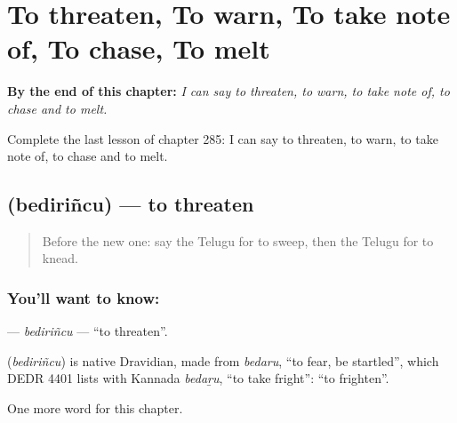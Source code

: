 
\chapter{To threaten, To warn, To take note of, To chase, To melt}
\label{ch:te-to-threaten-to-warn-to-take-note-of-to-chase-to-melt}

\begin{chapteropening}
\textbf{By the end of this chapter:} \emph{I can say to threaten, to warn, to take note of, to chase and to melt.}

Complete the last lesson of chapter 285: I can say to threaten, to warn, to take note of, to chase and to melt.
\end{chapteropening}

\section[\texorpdfstring{\te{బెదిరించు} (bediriñcu)}{బెదిరించు (bediriñcu)}]{ (bediriñcu) — to threaten}

\label{lesson:TE-C285-bedirincu}



\begin{quote}
Before the new one: say the Telugu for to sweep, then the Telugu for to knead.
\end{quote}

\subsection*{You'll want to know: }
\textbf{} — \emph{bediriñcu} — \textquotedblleft{}to threaten\textquotedblright{}.

\begin{cousinweb}
\textbf{} (\emph{bediriñcu}) is native Dravidian, made from \emph{bedaru}, \textquotedblleft{}to fear, be startled\textquotedblright{}, which DEDR 4401 lists with Kannada \emph{bedaṟu}, \textquotedblleft{}to take fright\textquotedblright{}: \textquotedblleft{}to frighten\textquotedblright{}.
\end{cousinweb}

\begin{grammarlens}[title={What you've built}]
One more word for this chapter.
\end{grammarlens}

